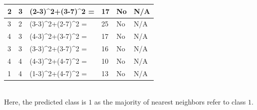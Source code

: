 \documentclass[conference]{IEEEtran}
\begin{document}
\begin{itemize}
\begin{table}[htbp]
\begin{tabular}{llllll}
\hline
2                      & 3                      & (2-3)\textasciicircum{}2+(3-7)\textasciicircum{}2                                         = & 17                                                                  & No                                                                                  & N/A   \\
\hline
3                      & 2                      & (3-3)\textasciicircum{}2+(2-7)\textasciicircum{}2                                         = & 25                                                                  & No                                                                                  & N/A   \\
\hline
4                      & 3                      & (4-3)\textasciicircum{}2+(3-7)\textasciicircum{}2                                         = & 17                                                                  & No                                                                                  & N/A   \\
\hline
3                      & 3                      & (3-3)\textasciicircum{}2+(3-7)\textasciicircum{}2                                         = & 16                                                                  & No                                                                                  & N/A   \\
\hline
4                      & 4                      & (4-3)\textasciicircum{}2+(4-7)\textasciicircum{}2                                         = & 10                                                                  & No                                                                                  & N/A   \\
\hline
1                      & 4                      & (1-3)\textasciicircum{}2+(4-7)\textasciicircum{}2                                         = & 13                                                                  & No                                                                                  & N/A  \\
\hline
\end{tabular}
\end{table}
\\
Here, the predicted class is $1$ as the majority of nearest neighbors refer to class $1$.\\


\end{itemize}
\end{document}
